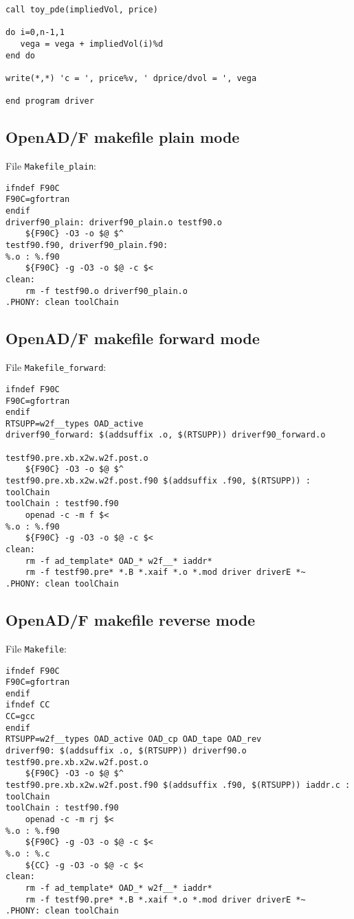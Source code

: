 \documentclass{amsart}
\theoremstyle{plain}
\numberwithin{equation}{section}
\begin{document}
\begin{appendix}
\begin{verbatim}
call toy_pde(impliedVol, price)

do i=0,n-1,1
   vega = vega + impliedVol(i)%d
end do

write(*,*) 'c = ', price%v, ' dprice/dvol = ', vega

end program driver
\end{verbatim}

\subsection{OpenAD/F makefile plain mode}

File \verb+Makefile_plain+:

\begin{verbatim}
ifndef F90C
F90C=gfortran
endif
driverf90_plain: driverf90_plain.o testf90.o
	${F90C} -O3 -o $@ $^
testf90.f90, driverf90_plain.f90:
%.o : %.f90
	${F90C} -g -O3 -o $@ -c $<
clean:
	rm -f testf90.o driverf90_plain.o
.PHONY: clean toolChain
\end{verbatim}

\subsection{OpenAD/F makefile forward mode}

File \verb+Makefile_forward+:

\begin{verbatim}
ifndef F90C
F90C=gfortran
endif
RTSUPP=w2f__types OAD_active
driverf90_forward: $(addsuffix .o, $(RTSUPP)) driverf90_forward.o
                                              testf90.pre.xb.x2w.w2f.post.o
	${F90C} -O3 -o $@ $^
testf90.pre.xb.x2w.w2f.post.f90 $(addsuffix .f90, $(RTSUPP)) : toolChain
toolChain : testf90.f90
	openad -c -m f $<
%.o : %.f90
	${F90C} -g -O3 -o $@ -c $<
clean:
	rm -f ad_template* OAD_* w2f__* iaddr*
	rm -f testf90.pre* *.B *.xaif *.o *.mod driver driverE *~
.PHONY: clean toolChain
\end{verbatim}

\subsection{OpenAD/F makefile reverse mode}

File \verb+Makefile+:

\begin{verbatim}
ifndef F90C
F90C=gfortran
endif
ifndef CC
CC=gcc
endif
RTSUPP=w2f__types OAD_active OAD_cp OAD_tape OAD_rev
driverf90: $(addsuffix .o, $(RTSUPP)) driverf90.o testf90.pre.xb.x2w.w2f.post.o
	${F90C} -O3 -o $@ $^
testf90.pre.xb.x2w.w2f.post.f90 $(addsuffix .f90, $(RTSUPP)) iaddr.c : toolChain
toolChain : testf90.f90
	openad -c -m rj $<
%.o : %.f90
	${F90C} -g -O3 -o $@ -c $<
%.o : %.c
	${CC} -g -O3 -o $@ -c $<
clean:
	rm -f ad_template* OAD_* w2f__* iaddr*
	rm -f testf90.pre* *.B *.xaif *.o *.mod driver driverE *~
.PHONY: clean toolChain
\end{verbatim}

\end{appendix}
\end{document}
